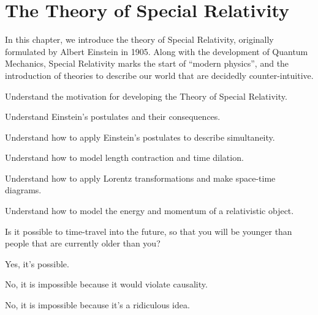 \chapter{The Theory of Special Relativity}
\label{chap:specialrelativity}
In this chapter, we introduce the theory of Special Relativity, originally formulated by Albert Einstein in 1905. Along with the development of Quantum Mechanics, Special Relativity marks the start of ``modern physics'', and the introduction of theories to describe our world that are decidedly counter-intuitive. 
 \vspace{1cm}
\begin{learningObjectives}
{
\item Understand the motivation for developing the Theory of Special Relativity.
\item Understand Einstein's postulates and their consequences.
\item Understand how to apply Einstein's postulates to describe simultaneity.
\item Understand how to model length contraction and time dilation.
\item Understand how to apply Lorentz transformations and make space-time diagrams.
\item Understand how to model the energy and momentum of a relativistic object.
}
\end{learningObjectives}

\begin{opening}
\begin{MCquestion}{Is it possible to time-travel into the future, so that you will be younger than people that are currently older than you?}
\item Yes, it's possible. \correct
\item No, it is impossible because it would violate causality.
\item No, it is impossible because it's a ridiculous idea.
\end{MCquestion}
\end{opening}

